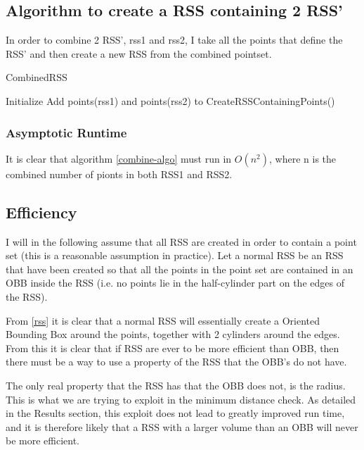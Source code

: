 \subsection{Algorithm to create a RSS containing 2 RSS'}
In order to combine  2 RSS', rss1 and rss2, I take all the points that define the RSS' and then create a new RSS from the combined pointset. 

\begin{algorithm}[H]
  \caption{CombinedRSS}
  \label{combine-algo}
   
  \dontprintsemicolon
  Initialize \points \;
  Add points(rss1) and points(rss2) to \points \;
  \return CreateRSSContainingPoints(\points) \;
\end{algorithm}

\subsubsection{Asymptotic Runtime}
It is clear that algorithm \ref{combine-algo} must run in $O(n^2)$, where n is the combined number of pionts in both RSS1 and RSS2. 


\subsection{Efficiency}
I will in the following assume that all RSS are created in order to contain a point set (this is a reasonable assumption in practice). Let a normal RSS be an RSS that have been created so that all the points in the point set are contained in an OBB inside the RSS (i.e. no points lie in the half-cylinder part on the edges of the RSS).  

From \ref{rss} it is clear that a normal RSS will essentially create a Oriented Bounding Box around the points, together with 2 cylinders around the edges. From this it is clear that if RSS are ever to be more efficient than OBB, then there must be a way to use a property of the RSS that the OBB's do not have. 

The only real property that the RSS has that the OBB does not, is the radius. This is what we are trying to exploit in the minimum distance check. As detailed in the Results section, this exploit does not lead to greatly improved run time, and it is therefore likely that a RSS with a larger volume than an OBB will never be more efficient. 

